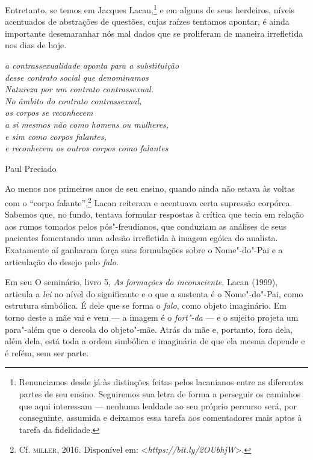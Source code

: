 Entretanto, se temos em Jacques Lacan,\footnote{Renunciamos desde já às
  distinções feitas pelos lacanianos entre as diferentes partes de seu
  ensino. Seguiremos sua letra de forma a perseguir os caminhos que aqui
  interessam --- nenhuma lealdade ao seu próprio percurso será, por
  conseguinte, assumida e deixamos essa tarefa aos comentadores mais
  aptos à tarefa da fidelidade.} e em alguns de seus herdeiros, níveis
acentuados de abstrações de questões, cujas raízes tentamos apontar, é
ainda importante desemaranhar nós mal dados que se proliferam de maneira
irrefletida nos dias de hoje.

\asterisc

\epigraph{\emph{a contrassexualidade aponta para a substituição\\
desse contrato social que denominamos\\
Natureza por um contrato contrassexual.\\
No âmbito do contrato contrassexual,\\
os corpos se reconhecem\\
a si mesmos não como homens ou mulheres,\\
e sim como corpos falantes,\\
e reconhecem os outros corpos como falantes}}{Paul Preciado}

Ao menos nos primeiros anos de seu ensino, quando ainda não estava às
voltas com o ``corpo falante'',\footnote{Cf. \textsc{miller}, 2016. Disponível em:
  \textless{}\emph{https://bit.ly/2OUbhjW}\textgreater{}.} Lacan reiterava e acentuava certa supressão corpórea.
Sabemos que, no fundo, tentava formular respostas à crítica que tecia em
relação aos rumos tomados pelos pós"-freudianos, que conduziam as
análises de seus pacientes fomentando uma adesão irrefletida à imagem
egóica do analista. Exatamente aí ganharam força suas formulações sobre
o Nome"-do"-Pai e a articulação do desejo pelo \emph{falo}.

Em seu O seminário, livro 5, \emph{As formações do inconsciente}, Lacan
(1999), articula a \emph{lei} no nível do significante e o que a
sustenta é o Nome"-do"-Pai, como estrutura simbólica. É dele que se forma
o \emph{falo}, como objeto imaginário. Em torno deste a mãe vai e vem ---
a imagem é o \emph{fort"-da} --- e o sujeito projeta um para"-além que o
descola do objeto"-mãe. Atrás da mãe e, portanto, fora dela, além dela,
está toda a ordem simbólica e imaginária de que ela mesma depende e é
refém, sem ser parte.

